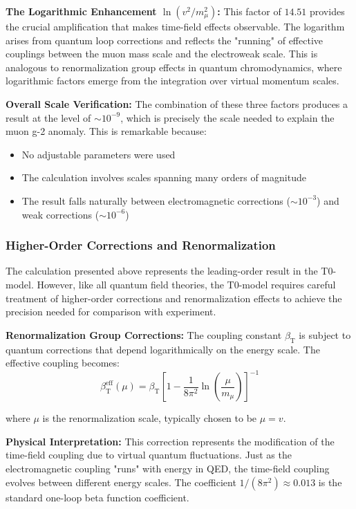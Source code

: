 \documentclass[12pt,a4paper]{article}
\newcommand{\betaT}{\beta_{\text{T}}}
\begin{document}
	\textbf{The Logarithmic Enhancement $\ln(v^2/m_\mu^2)$:}
	This factor of $14.51$ provides the crucial amplification that makes time-field effects observable. The logarithm arises from quantum loop corrections and reflects the "running" of effective couplings between the muon mass scale and the electroweak scale. This is analogous to renormalization group effects in quantum chromodynamics, where logarithmic factors emerge from the integration over virtual momentum scales.
	
	\textbf{Overall Scale Verification:}
	The combination of these three factors produces a result at the level of $\sim 10^{-9}$, which is precisely the scale needed to explain the muon g-2 anomaly. This is remarkable because:
	\begin{itemize}
		\item No adjustable parameters were used
		\item The calculation involves scales spanning many orders of magnitude
		\item The result falls naturally between electromagnetic corrections ($\sim 10^{-3}$) and weak corrections ($\sim 10^{-6}$)
	\end{itemize}
	
	\subsubsection{Higher-Order Corrections and Renormalization}
	
	The calculation presented above represents the leading-order result in the T0-model. However, like all quantum field theories, the T0-model requires careful treatment of higher-order corrections and renormalization effects to achieve the precision needed for comparison with experiment.
	
	\textbf{Renormalization Group Corrections:}
	The coupling constant $\betaT$ is subject to quantum corrections that depend logarithmically on the energy scale. The effective coupling becomes:
	\begin{equation}
		\betaT^{\text{eff}}(\mu) = \betaT \left[1 - \frac{1}{8\pi^2} \ln\left(\frac{\mu}{m_\mu}\right)\right]^{-1}
	\end{equation}
	
	where $\mu$ is the renormalization scale, typically chosen to be $\mu = v$.
	
	\textbf{Physical Interpretation:} This correction represents the modification of the time-field coupling due to virtual quantum fluctuations. Just as the electromagnetic coupling "runs" with energy in QED, the time-field coupling evolves between different energy scales. The coefficient $1/(8\pi^2) \approx 0.013$ is the standard one-loop beta function coefficient.
	
\end{document}
